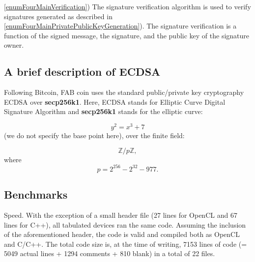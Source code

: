 \documentclass{article}
\newcommand{\secpTwoFiveSixKone}{{\bf secp256k1}}
\begin{document}
\noindent\ref{enumFourMainVerification}) The signature verification algorithm is used to verify signatures generated as described in \ref{enumFourMainPrivatePublicKeyGeneration}). The signature verification is a function of the signed message, the signature, and the public key of the signature owner.
\subsection{A brief description of ECDSA}\label{sectionECDSAgeneral}
Following Bitcoin, FAB coin uses the standard public/private key cryptography ECDSA over \secpTwoFiveSixKone. Here, ECDSA stands for Elliptic Curve Digital Signature Algorithm and \secpTwoFiveSixKone{} stands for the elliptic curve:

\[
y^2 = x^3 + 7
\]
(we do not specify the base point here), over the finite field:

\[
\mathbb Z / p\mathbb Z, 
\]
where
\begin{equation}\label{eqThePrime}
p= 2^{256} - 2^{32} - 977.
\end{equation}

\subsection{Benchmarks}

Speed. With the exception of a small header file (27 lines for OpenCL and 67 lines for C++), all tabulated devices ran the same code. Assuming the inclusion of the aforementioned header, the code is valid and compiled both as OpenCL and C/C++. The total code size is, at the time of writing, 7153 lines of code (= 5049 actual lines + 1294 comments + 810 blank) in a total of 22 files.
\end{document}
